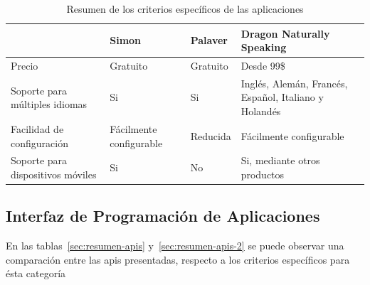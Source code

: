 \begin{table}[H]
\centering
\footnotesize
\begin{tabular}{|p{3.5cm}|p{3.5cm}|p{3.5cm}|p{3.5cm}|}
\hline
                                      &  Simon                                                       &  Palaver                                       & Dragon Naturally Speaking \\
\hline
Precio                                & Gratuito                                                     & Gratuito                                       & Desde 99\$  \\
Soporte para m\'ultiples idiomas      & Si                                                           & Si                                             & Ingl\'es, Alem\'an, Franc\'es, Espa\~nol, Italiano y Holand\'es \\
Facilidad de configuraci\'on          & F\'acilmente configurable                                    & Reducida                                       & F\'acilmente configurable \\
Soporte para dispositivos m\'oviles   & Si                                                           & No                                             & Si, mediante otros productos \\
\hline
\end{tabular}
\caption{Resumen de los criterios espec\'ificos de las aplicaciones}
\label{sec:resumen-aplicaciones}
\end{table}

\subsection{Interfaz de Programaci\'on de Aplicaciones}

En las tablas~\ref{sec:resumen-apis} y~\ref{sec:resumen-apis-2} se puede observar una comparaci\'on entre las \gls{api}s presentadas, respecto a los criterios espec\'ificos
para \'esta categor\'ia


